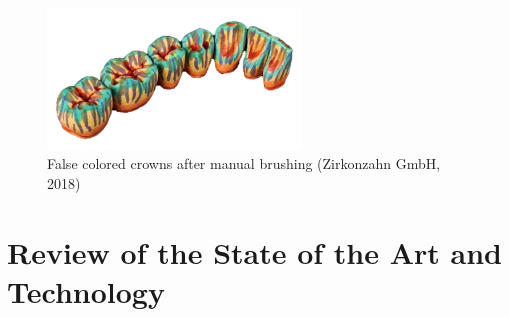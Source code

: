 \begin{figure}[h]
	\centering
	\includegraphics[width=0.6\textwidth]{grafiken/false_colored.png}
	\caption{False colored crowns after manual brushing (Zirkonzahn GmbH, 2018)}
	\label{fig:bild3}
\end{figure}


\chapter{Review of the State of the Art and Technology}
\label{sec:kritik_stand_technik}
